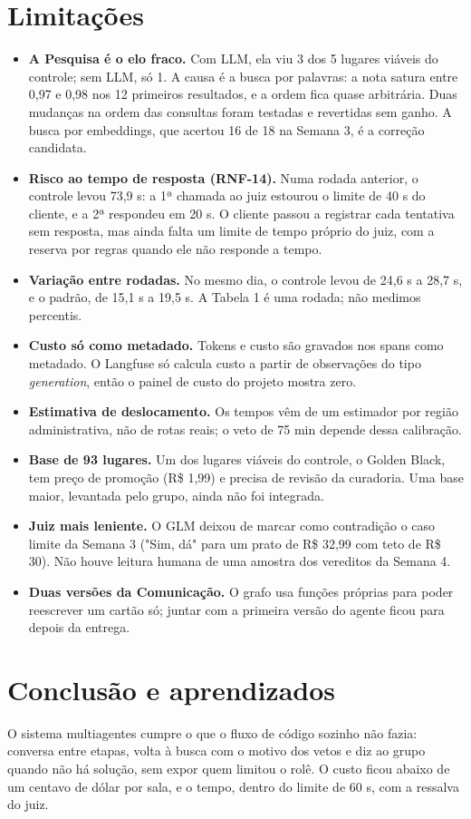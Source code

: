 \documentclass[12pt,a4paper]{article}
\begin{document}
\section{Limitações}
\begin{itemize}
\item \textbf{A Pesquisa é o elo fraco.} Com LLM, ela viu 3 dos 5 lugares viáveis do controle; sem LLM, só 1. A causa é a busca por palavras: a nota satura entre 0,97 e 0,98 nos 12 primeiros resultados, e a ordem fica quase arbitrária. Duas mudanças na ordem das consultas foram testadas e revertidas sem ganho. A busca por embeddings, que acertou 16 de 18 na Semana 3, é a correção candidata.
\item \textbf{Risco ao tempo de resposta (RNF-14).} Numa rodada anterior, o controle levou 73,9 s: a 1ª chamada ao juiz estourou o limite de 40 s do cliente, e a 2ª respondeu em 20 s. O cliente passou a registrar cada tentativa sem resposta, mas ainda falta um limite de tempo próprio do juiz, com a reserva por regras quando ele não responde a tempo.
\item \textbf{Variação entre rodadas.} No mesmo dia, o controle levou de 24,6 s a 28,7 s, e o padrão, de 15,1 s a 19,5 s. A Tabela 1 é uma rodada; não medimos percentis.
\item \textbf{Custo só como metadado.} Tokens e custo são gravados nos spans como metadado. O Langfuse só calcula custo a partir de observações do tipo \textit{generation}, então o painel de custo do projeto mostra zero.
\item \textbf{Estimativa de deslocamento.} Os tempos vêm de um estimador por região administrativa, não de rotas reais; o veto de 75 min depende dessa calibração.
\item \textbf{Base de 93 lugares.} Um dos lugares viáveis do controle, o Golden Black, tem preço de promoção (R\$ 1,99) e precisa de revisão da curadoria. Uma base maior, levantada pelo grupo, ainda não foi integrada.
\item \textbf{Juiz mais leniente.} O GLM deixou de marcar como contradição o caso limite da Semana 3 ("Sim, dá" para um prato de R\$ 32,99 com teto de R\$ 30). Não houve leitura humana de uma amostra dos vereditos da Semana 4.
\item \textbf{Duas versões da Comunicação.} O grafo usa funções próprias para poder reescrever um cartão só; juntar com a primeira versão do agente ficou para depois da entrega.
\end{itemize}


\section{Conclusão e aprendizados}
O sistema multiagentes cumpre o que o fluxo de código sozinho não fazia: conversa entre etapas, volta à busca com o motivo dos vetos e diz ao grupo quando não há solução, sem expor quem limitou o rolê. O custo ficou abaixo de um centavo de dólar por sala, e o tempo, dentro do limite de 60 s, com a ressalva do juiz.
\end{document}
